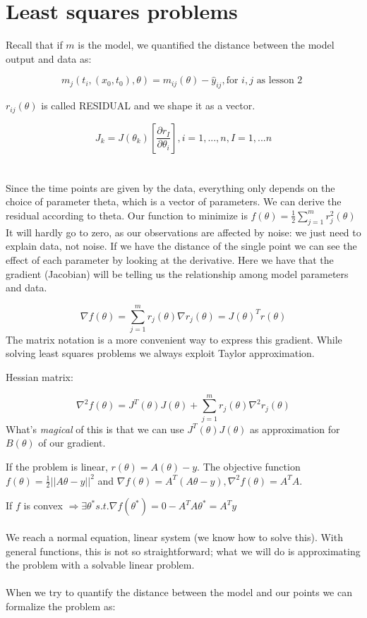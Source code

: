 \graphicspath{{chapters/10/images/}}
\chapter{Least squares problems}


Recall that if $m$ is the model, we quantified the distance between the
model output and data as:

$$
m_j(t_i,(x_0,t_0), \theta) = m_{ij}(\theta) - \hat{y}_{ij}, \text{for } i,j \text{ as lesson 2 }
$$

$r_{ij}(\theta)$ is called RESIDUAL and we shape it as a vector.

$$
J_k=J(\theta_k)[\frac{\partial r_I}{\partial\theta_i}], i=1, ...,n, I=1,...n
$$
\\
\\
\noindent
Since the time points are given by the data, everything only depends on
the choice of parameter theta, which is a vector of parameters. We can
derive the residual according to theta. Our function to minimize is
$f(\theta)=\frac{1}{2}\sum^m_{j=1}r_j^2(\theta)$
\noindent
It will hardly go to zero, as our observations are affected by noise: we
just need to explain data, not noise. If we have the distance of the
single point we can see the effect of each parameter by looking at the
derivative. Here we have that the gradient (Jacobian) will be telling us
the relationship among model parameters and data.

$$
\nabla f(\theta)=\sum^m_{j=1}r_j(\theta)\nabla r_j(\theta)= J(\theta)^Tr(\theta)
$$
\noindent
The matrix notation is a more convenient way to express this gradient.
While solving least squares problems we always exploit Taylor
approximation.

Hessian matrix:

$$
\nabla^2 f(\theta)=J^T(\theta)J(\theta)+ \sum^m_{j=1}r_j(\theta) \nabla^2 r_j(\theta)
$$
\noindent
What's \emph{magical} of this is that we can use $J^T(\theta)J(\theta)$
as approximation for $B(\theta)$ of our gradient.

If the problem is linear, $r(\theta)=A(\theta)-y$. The objective
function $f(\theta)=\frac{1}{2} || A\theta-y||^2$ and
$\nabla f(\theta)=A^T(A\theta-y), \nabla^2 f(\theta)=A^TA$.

If $f$ is convex
$\Rightarrow \exists \theta^* s.t. \nabla f(\theta^*)=0 - A^TA\theta^*=A^Ty$
\\
\\
\noindent
We reach a normal equation, linear system (we know how to solve this). With general functions, this is not so straightforward; what we will do
is approximating the problem with a solvable linear problem.
\\
\\
\noindent
When we try to quantify the distance between the model and our points we can formalize the problem as:

